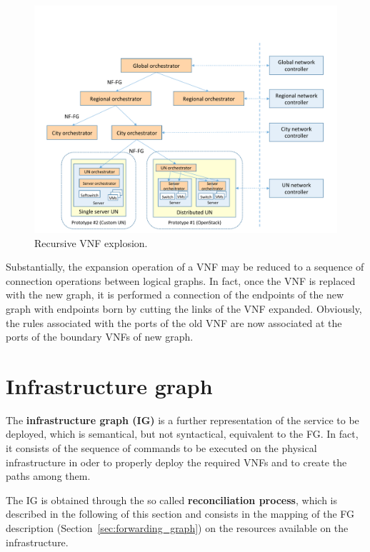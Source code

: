 \begin{figure}[h]
	\centering
	\includegraphics[clip= true, width= 0.8\columnwidth, trim= 0cm 0cm 0cm 0cm, page=42]{images/Pictures_definitivo.pdf}
	\caption{Recursive VNF explosion.}
	\label{fig:firewall_expansion}
\end{figure}

Substantially, the expansion operation of a VNF may be reduced to a sequence of connection operations between logical graphs. In fact, once the VNF is replaced with the new graph, it is performed a connection of the endpoints of the new graph with endpoints born by cutting the links of the VNF expanded. Obviously, the rules associated with the ports of the old VNF are now associated at the ports of the boundary VNFs of new graph.









\section{Infrastructure graph}

\label{sec:ig}

The \textbf{infrastructure graph (IG)} is a further representation of the service to be deployed, which is semantical, but not syntactical, equivalent to the FG.
In fact, it consists of the sequence of commands to be executed on the physical infrastructure in oder to properly deploy the required VNFs and to create the paths among them.

The IG is obtained through the so called \textbf{reconciliation process}, which is described in the following of this section and consists in the mapping of the FG description (Section~\ref{sec:forwarding_graph}) on the resources available on the infrastructure.

